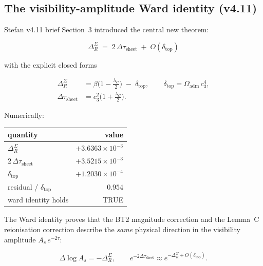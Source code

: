 \documentclass[11pt,a4paper]{article}
\begin{document}
\subsection{The visibility-amplitude Ward identity (v4.11)}
\label{sec:v412_ward}

Stefan v4.11 brief Section~3 introduced the central new theorem:

\begin{equation}
\boxed{\;
\Delta_R^\Sigma \;=\; 2\,\Delta\tau_{\mathrm{sheet}}
\;+\; O(\delta_{\mathrm{top}})
\;}
\label{eq:ward_identity}
\end{equation}

with the explicit closed forms

\begin{align}
\Delta_R^\Sigma &= \beta\bigl(1-\tfrac{\lambda_C}{2}\bigr)
\;-\; \delta_{\mathrm{top}}, \qquad
\delta_{\mathrm{top}} = \Omega_{\mathrm{adm}}\,c_3^4 ,\\
\Delta\tau_{\mathrm{sheet}} &= c_3^2\bigl(1+\tfrac{\lambda_C}{2}\bigr).
\end{align}

Numerically:

\begin{center}
\renewcommand{\arraystretch}{1.15}
\begin{tabular}{lr}\hline\hline
quantity & value \\\hline
\(\Delta_R^\Sigma\)                & \(+3.6363\times 10^{-3}\) \\
\(2\,\Delta\tau_{\mathrm{sheet}}\) & \(+3.5215\times 10^{-3}\) \\
\(\delta_{\mathrm{top}}\)          & \(+1.2030\times 10^{-4}\) \\
residual / \(\delta_{\mathrm{top}}\) & \(0.954\) \\
ward identity holds                  & TRUE \\\hline
\end{tabular}
\end{center}

The Ward identity proves that the BT2 magnitude correction and the
Lemma~C reionisation correction describe the \emph{same} physical
direction in the visibility amplitude \(A_s\,e^{-2\tau}\):

\begin{equation}
\Delta\log A_s = -\Delta_R^\Sigma, \qquad
e^{-2\Delta\tau_{\mathrm{sheet}}} \approx
e^{-\Delta_R^\Sigma + O(\delta_{\mathrm{top}})}.
\end{equation}
\end{document}
